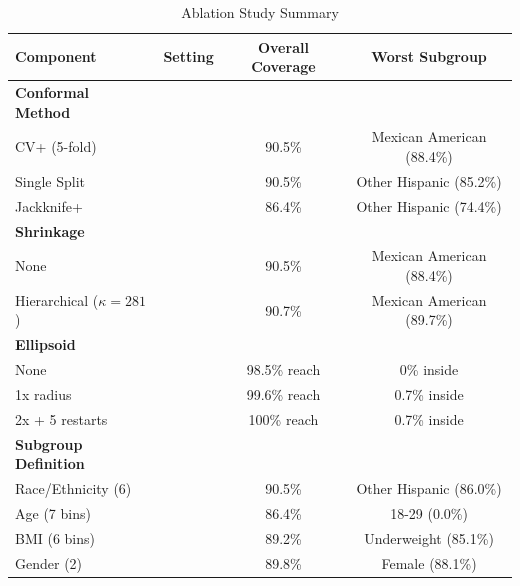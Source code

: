 \begin{table}[htbp]
\centering
\caption{Ablation Study Summary}
\label{tab:ablation}
\begin{tabular}{lccc}
\toprule
Component & Setting & Overall Coverage & Worst Subgroup \\
\midrule
\textbf{Conformal Method} & & & \\
CV+ (5-fold) & & 90.5\% & Mexican American (88.4\%) \\
Single Split & & 90.5\% & Other Hispanic (85.2\%) \\
Jackknife+ & & 86.4\% & Other Hispanic (74.4\%) \\
\midrule
\textbf{Shrinkage} & & & \\
None & & 90.5\% & Mexican American (88.4\%) \\
Hierarchical ($\kappa=281$) & & 90.7\% & Mexican American (89.7\%) \\
\midrule
\textbf{Ellipsoid} & & & \\
None & & 98.5\% reach & 0\% inside \\
1x radius & & 99.6\% reach & 0.7\% inside \\
2x + 5 restarts & & 100\% reach & 0.7\% inside \\
\midrule
\textbf{Subgroup Definition} & & & \\
Race/Ethnicity (6) & & 90.5\% & Other Hispanic (86.0\%) \\
Age (7 bins) & & 86.4\% & 18-29 (0.0\%) \\
BMI (6 bins) & & 89.2\% & Underweight (85.1\%) \\
Gender (2) & & 89.8\% & Female (88.1\%) \\
\bottomrule
\end{tabular}
\end{table}
